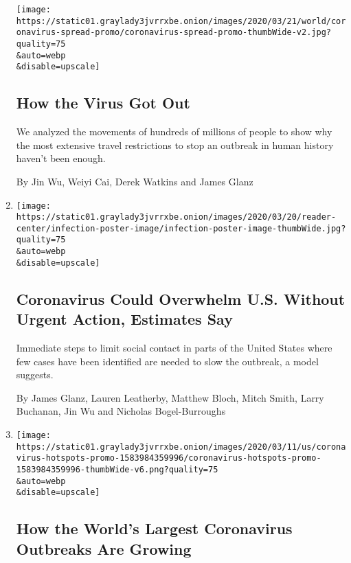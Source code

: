 \begin{enumerate}
  \texttt{[image: https://static01.graylady3jvrrxbe.onion/images/2020/03/21/world/coronavirus-spread-promo/coronavirus-spread-promo-thumbWide-v2.jpg?quality=75\\\&auto=webp\\\&disable=upscale]}

  \hypertarget{how-the-virus-got-out}{%
  \subsection{How the Virus Got Out}\label{how-the-virus-got-out}}

  We analyzed the movements of hundreds of millions of people to show
  why the most extensive travel restrictions to stop an outbreak in
  human history haven't been enough.

  By Jin Wu, Weiyi Cai, Derek Watkins and James Glanz
\item
  \href{/interactive/2020/03/20/us/coronavirus-model-us-outbreak.html}{}

  \texttt{[image: https://static01.graylady3jvrrxbe.onion/images/2020/03/20/reader-center/infection-poster-image/infection-poster-image-thumbWide.jpg?quality=75\\\&auto=webp\\\&disable=upscale]}

  \hypertarget{coronavirus-could-overwhelm-us-without-urgent-action-estimates-say}{%
  \subsection{Coronavirus Could Overwhelm U.S. Without Urgent Action,
  Estimates
  Say}\label{coronavirus-could-overwhelm-us-without-urgent-action-estimates-say}}

  Immediate steps to limit social contact in parts of the United States
  where few cases have been identified are needed to slow the outbreak,
  a model suggests.

  By James Glanz, Lauren Leatherby, Matthew Bloch, Mitch Smith, Larry
  Buchanan, Jin Wu and Nicholas Bogel-Burroughs
\item
  \href{/interactive/2020/world/coronavirus-maps-italy-iran-korea.html}{}

  \texttt{[image: https://static01.graylady3jvrrxbe.onion/images/2020/03/11/us/coronavirus-hotspots-promo-1583984359996/coronavirus-hotspots-promo-1583984359996-thumbWide-v6.png?quality=75\\\&auto=webp\\\&disable=upscale]}

  \hypertarget{how-the-worlds-largest-coronavirus-outbreaks-are-growing}{%
  \subsection{How the World's Largest Coronavirus Outbreaks Are
  Growing}\label{how-the-worlds-largest-coronavirus-outbreaks-are-growing}}


\end{enumerate}
